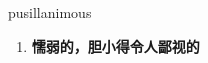 
\begin{frame}
{\huge pusillanimous}
\begin{center}
\begin{enumerate}\Large
  \item \textbf{懦弱的，胆小得令人鄙视的}
\end{enumerate}
\end{center}
\end{frame}

